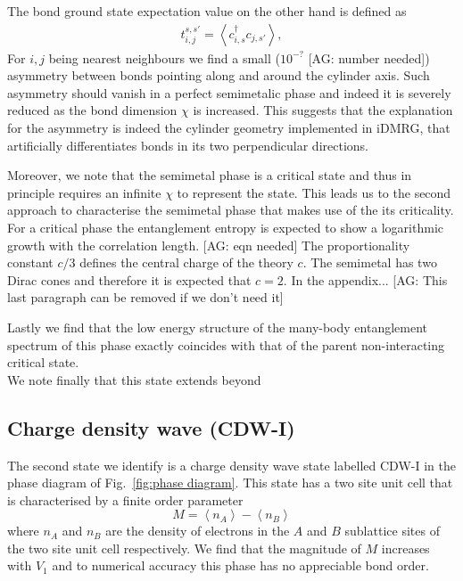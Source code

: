 \documentclass[aps,prx,10pt,twocolumn,floatfix,superscriptaddress,showpacs,numerical,footinbib]{revtex4-1}
\newcommand{\noteAG}[1]{{\color{blue} [AG: #1]}}
\begin{document}
The bond ground state expectation value on the other hand is defined as
%
\begin{eqnarray}
\label{eq:bond}
t^{s,s'}_{i,j}=\left\langle c^{\dagger}_{i,s}c_{j,s'}\right\rangle,  
\end{eqnarray}
%
For $i,j$ being nearest neighbours we find a small ($10^{-?}$ \noteAG{number needed}) asymmetry
between bonds pointing along and around the cylinder axis.
%
Such asymmetry should vanish in a perfect semimetalic phase and indeed it is severely reduced as the bond dimension $\chi$ is increased.
% 
This suggests that the explanation for the asymmetry is indeed the cylinder geometry implemented in iDMRG, that artificially differentiates bonds in its two perpendicular directions.
%

%
Moreover, we note that the semimetal phase is a critical state and thus in principle requires an infinite $\chi$ to represent the state.
%
This leads us to the second approach to characterise the semimetal phase that makes use of the its criticality.
%
For a critical phase the entanglement entropy is expected to show a logarithmic growth with the correlation length.
\noteAG{eqn needed}
%
The proportionality constant $c/3$ defines the central charge of the theory $c$. 
%
The semimetal has two Dirac cones and therefore it is expected that $c=2$. 
%
In the appendix...
\noteAG{This last paragraph can be removed if we don't need it}

%
Lastly we find that the low energy structure of the many-body 
entanglement spectrum of this phase exactly coincides with that of the parent non-interacting critical state.\\ 
%

%
We note finally that this state extends beyond 

\subsection{Charge density wave (CDW-I)}
%
The second state we identify is a charge density wave state labelled CDW-I in the phase diagram of Fig.~\ref{fig:phase diagram}.
%
This state has a two site unit cell that is characterised by a finite order parameter
%
\begin{equation}
\label{eq:CDW}
%
M=\left\langle n_{A} \right\rangle-\left\langle n_{B}\right\rangle
%
\end{equation}
%
where $n_{A}$ and $n_{B}$ are the density of electrons in the $A$ and $B$ sublattice sites of the two site unit cell respectively.
%
We find that the magnitude of $M$ increases with $V_{1}$ and to numerical accuracy this phase has no appreciable bond order.\\
%
\end{document}
